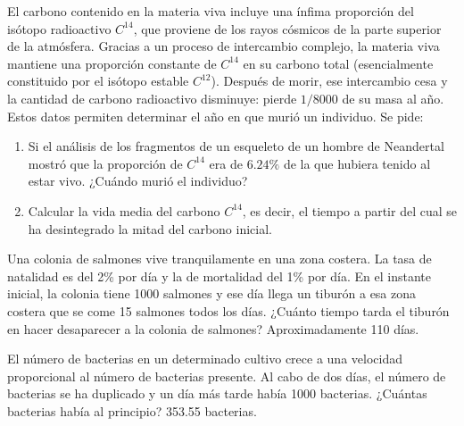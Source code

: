 {El carbono contenido en la materia viva incluye una ínfima proporción del isótopo radioactivo $C^{14}$, que proviene de los rayos cósmicos de la parte superior de la atmósfera.
Gracias a un proceso de intercambio complejo, la materia viva mantiene una proporción constante de $C^{14}$ en su carbono total (esencialmente constituido por el isótopo estable $C^{12}$).
Después de morir, ese intercambio cesa y la cantidad de carbono radioactivo disminuye: pierde $1/8000$ de su masa al año.
Estos datos permiten determinar el año en que murió un individuo. 
Se pide:
\begin{enumerate}
\item Si el análisis de los fragmentos de un esqueleto de un hombre de Neandertal mostró que la proporción de $C^{14}$ era de $6.24\%$ de la que hubiera tenido al estar vivo.
¿Cuándo murió el individuo?
\item Calcular la vida media del carbono $C^{14}$, es decir, el tiempo a partir del cual se ha desintegrado la mitad del carbono inicial.  
\end{enumerate}
}
{
}
{}


{Una colonia de salmones vive tranquilamente en una zona costera.
La tasa de natalidad es del 2\% por día y la de mortalidad del 1\% por día. 
En el instante inicial, la colonia tiene 1000 salmones y ese día llega un tiburón a esa zona costera que se come 15 salmones todos los días.
¿Cuánto tiempo tarda el tiburón en hacer desaparecer a la colonia de salmones?
}
{Aproximadamente 110 días.
}
{}


{El número de bacterias en un determinado cultivo crece a una velocidad proporcional al número de bacterias presente. 
Al cabo de dos días, el número de bacterias se ha duplicado y un día más tarde había 1000 bacterias. 
¿Cuántas bacterias había al principio? 
}
{353.55 bacterias.
}
{}





